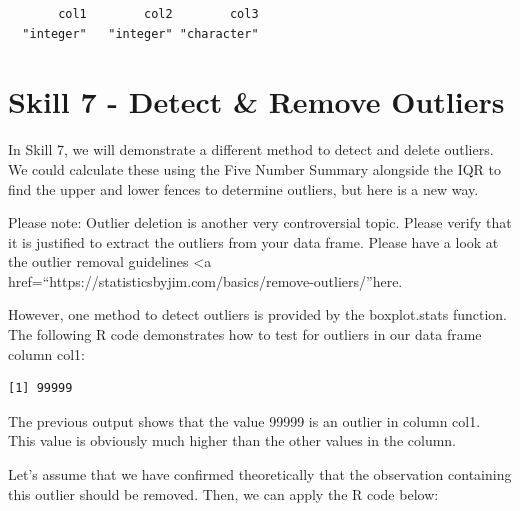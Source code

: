 \documentclass[
  letterpaper,
  DIV=11,
  numbers=noendperiod]{scrreprt}
\newenvironment{Shaded}{\begin{snugshade}}{\end{snugshade}}
\newcommand{\CommentTok}[1]{\textcolor[rgb]{0.37,0.37,0.37}{#1}}
\newcommand{\FunctionTok}[1]{\textcolor[rgb]{0.28,0.35,0.67}{#1}}
\newcommand{\NormalTok}[1]{\textcolor[rgb]{0.00,0.23,0.31}{#1}}
\newcommand{\SpecialCharTok}[1]{\textcolor[rgb]{0.37,0.37,0.37}{#1}}
\begin{document}
\begin{verbatim}
       col1        col2        col3 
  "integer"   "integer" "character" 
\end{verbatim}

\section*{Skill 7 - Detect \& Remove
Outliers}\label{skill-7---detect-remove-outliers}


In Skill 7, we will demonstrate a different method to detect and delete
outliers. We could calculate these using the Five Number Summary
alongside the IQR to find the upper and lower fences to determine
outliers, but here is a new way.

Please note: Outlier deletion is another very controversial topic.
Please verify that it is justified to extract the outliers from your
data frame. Please have a look at the outlier removal guidelines
\textless a
href=``https://statisticsbyjim.com/basics/remove-outliers/''here.

However, one method to detect outliers is provided by the boxplot.stats
function. The following R code demonstrates how to test for outliers in
our data frame column col1:

\begin{Shaded}
\end{Shaded}

\begin{verbatim}
[1] 99999
\end{verbatim}

The previous output shows that the value 99999 is an outlier in column
col1. This value is obviously much higher than the other values in the
column.

Let's assume that we have confirmed theoretically that the observation
containing this outlier should be removed. Then, we can apply the R code
below:
\end{document}

